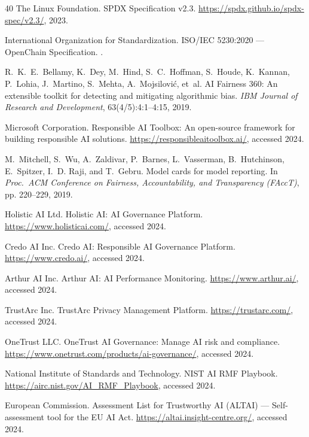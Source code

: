 \documentclass[11pt,twocolumn]{article}
\begin{document}
\begin{thebibliography}{40}
The Linux Foundation.
\newblock SPDX Specification v2.3.
\newblock \url{https://spdx.github.io/spdx-spec/v2.3/}, 2023.

International Organization for Standardization.
\newblock ISO/IEC 5230:2020 --- OpenChain Specification.
.

R.~K.~E.~Bellamy, K.~Dey, M.~Hind, S.~C.~Hoffman, S.~Houde,
  K.~Kannan, P.~Lohia, J.~Martino, S.~Mehta, A.~Mojsilovi{\'c}, et~al.
\newblock AI Fairness 360: An extensible toolkit for detecting and mitigating
  algorithmic bias.
\newblock \emph{IBM Journal of Research and Development}, 63(4/5):4:1--4:15,
  2019.

Microsoft Corporation.
\newblock Responsible AI Toolbox: An open-source framework for building
  responsible AI solutions.
\newblock \url{https://responsibleaitoolbox.ai/}, accessed 2024.

M.~Mitchell, S.~Wu, A.~Zaldivar, P.~Barnes, L.~Vasserman, B.~Hutchinson,
  E.~Spitzer, I.~D. Raji, and T.~Gebru.
\newblock Model cards for model reporting.
\newblock In \emph{Proc.\ ACM Conference on Fairness, Accountability, and
  Transparency (FAccT)}, pp. 220--229, 2019.

Holistic AI Ltd.
\newblock Holistic AI: AI Governance Platform.
\newblock \url{https://www.holisticai.com/}, accessed 2024.

Credo AI Inc.
\newblock Credo AI: Responsible AI Governance Platform.
\newblock \url{https://www.credo.ai/}, accessed 2024.

Arthur AI Inc.
\newblock Arthur AI: AI Performance Monitoring.
\newblock \url{https://www.arthur.ai/}, accessed 2024.

TrustArc Inc.
\newblock TrustArc Privacy Management Platform.
\newblock \url{https://trustarc.com/}, accessed 2024.

OneTrust LLC.
\newblock OneTrust AI Governance: Manage AI risk and compliance.
\newblock \url{https://www.onetrust.com/products/ai-governance/}, accessed 2024.

National Institute of Standards and Technology.
\newblock NIST AI RMF Playbook.
\newblock \url{https://airc.nist.gov/AI_RMF_Playbook}, accessed 2024.

European Commission.
\newblock Assessment List for Trustworthy AI (ALTAI) --- Self-assessment tool
  for the EU AI Act.
\newblock \url{https://altai.insight-centre.org/}, accessed 2024.


\end{thebibliography}
\end{document}
